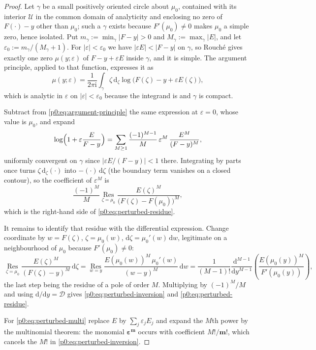 \documentclass[11pt,a4paper,oneside]{book}
\theoremstyle{plain}
\theoremstyle{definition}
\theoremstyle{remark}
\newcommand{\ii}{\mathrm{i}}
\newcommand{\dd}{\mathrm{d}}
\begin{document}
\begin{proof}
Let $\gamma$ be a small positively oriented circle about $\mu_{0}$, contained
with its interior $\mathcal{U}$ in the common domain of analyticity and
enclosing no zero of $F(\cdot)-y$ other than $\mu_{0}$; such a $\gamma$ exists
because $F'(\mu_{0})\ne0$ makes $\mu_{0}$ a simple zero, hence isolated.  Put
$m_{\gamma}:=\min_{\gamma}|F-y|>0$ and $M_{\gamma}:=\max_{\gamma}|E|$, and let
$\varepsilon_{0}:=m_{\gamma}/(M_{\gamma}+1)$.  For
$|\varepsilon|<\varepsilon_{0}$ we have $|\varepsilon E|<|F-y|$ on $\gamma$,
so Rouch\'e gives exactly one zero $\mu(y;\varepsilon)$ of
$F-y+\varepsilon E$ inside $\gamma$, and it is simple.  The argument
principle, applied to that function, expresses it as
\begin{equation}\label{p0:eq:argument-principle}
 \mu(y;\varepsilon)=\frac1{2\pi\ii}\int_{\gamma}\zeta\,
 \dd_{\zeta}\log\bigl(F(\zeta)-y+\varepsilon E(\zeta)\bigr),
\end{equation}
which is analytic in $\varepsilon$ on $|\varepsilon|<\varepsilon_{0}$ because
the integrand is and $\gamma$ is compact.

Subtract from \eqref{p0:eq:argument-principle} the same expression at
$\varepsilon=0$, whose value is $\mu_{0}$, and expand
\[
 \log\Bigl(1+\varepsilon\frac{E}{F-y}\Bigr)
 =\sum_{M\ge1}\frac{(-1)^{M-1}}{M}\,\varepsilon^{M}\,
 \frac{E^{M}}{(F-y)^{M}},
\]
uniformly convergent on $\gamma$ since $|\varepsilon E/(F-y)|<1$ there.
Integrating by parts once turns $\zeta\,\dd_{\zeta}(\cdot)$ into
$-(\cdot)\,\dd\zeta$ (the boundary term vanishes on a closed contour), so the
coefficient of $\varepsilon^{M}$ is
\[
 \frac{(-1)^{M}}{M}\operatorname*{Res}_{\zeta=\mu_{0}}
 \frac{E(\zeta)^{M}}{\bigl(F(\zeta)-F(\mu_{0})\bigr)^{M}},
\]
which is the right-hand side of \eqref{p0:eq:perturbed-residue}.

It remains to identify that residue with the differential expression.  Change
coordinate by $w=F(\zeta)$, $\zeta=\mu_{0}(w)$, $\dd\zeta=\mu_{0}'(w)\,\dd w$,
legitimate on a neighbourhood of $\mu_{0}$ because $F'(\mu_{0})\ne0$:
\[
 \operatorname*{Res}_{\zeta=\mu_{0}}
 \frac{E(\zeta)^{M}}{(F(\zeta)-y)^{M}}\,\dd\zeta
 =\operatorname*{Res}_{w=y}
 \frac{E(\mu_{0}(w))^{M}\,\mu_{0}'(w)}{(w-y)^{M}}\,\dd w
 =\frac1{(M-1)!}\frac{\dd^{M-1}}{\dd y^{M-1}}
 \left(\frac{E(\mu_{0}(y))^{M}}{F'(\mu_{0}(y))}\right),
\]
the last step being the residue of a pole of order $M$.  Multiplying by
$(-1)^{M}/M$ and using $\dd/\dd y=\mathcal{D}$ gives
\eqref{p0:eq:perturbed-inversion} and \eqref{p0:eq:perturbed-residue}.

For \eqref{p0:eq:perturbed-multi} replace $E$ by $\sum_{j}\varepsilon_{j}E_{j}$
and expand the $M$th power by the multinomial theorem: the monomial
$\boldsymbol\varepsilon^{\boldsymbol m}$ occurs with coefficient
$M!/\boldsymbol m!$, which cancels the $M!$ in
\eqref{p0:eq:perturbed-inversion}.
\end{proof}
\end{document}
